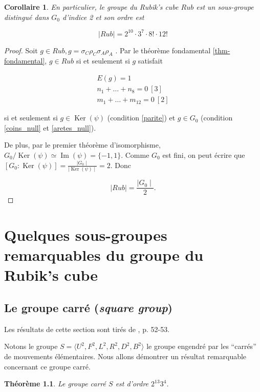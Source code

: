 \documentclass[french]{report}
\newtheorem{theorem}{Théorème}
\newtheorem*{corollary}{Corollaire}
\begin{document}
\begin{corollary}
  En particulier, le groupe du Rubik's cube $Rub$ est un sous-groupe distingué dans $G_0$ d'indice 2 et son ordre est

  $$ \mid Rub \mid = 2 ^{10} \cdot 3 ^{7} \cdot 8! \cdot 12! $$
\end{corollary}

\begin{proof}
  Soit $g \in Rub, g = \sigma_C\rho_C\sigma_A \rho_A$ .
  Par le théorème fondamental \ref{thm-fondamental}, $g \in Rub$ si et seulement si $g$ satisfait

  \begin{gather}
    E(g)=1 \label{parite} \\
    n_1 + \dots + n_8 = 0 \ [  3  ] \label{coins_null} \\
    m_1 + \dots + m _{12} = 0 \ [  2 ]  \label{aretes_null}
  \end{gather}

  si et seulement si $g \in \operatorname{Ker}(\psi)$ (condition \ref{parite}) et $g \in G_0$ (condition \ref{coins_null} et \ref{aretes_null}).

  De plus, par le premier théorème d'isomorphisme, $G_0/ \operatorname{Ker}(\psi) \simeq \operatorname{Im}(\psi) = \{ -1,1 \} $. Comme $G_0$ est fini, on peut écrire que $[G_0 : \operatorname{Ker}(\psi)]  = \frac{\mid G_0 \mid}{\mid \operatorname{Ker}(\psi)\mid}= 2$. Donc

  $$ \mid Rub \mid = \frac{\mid G_0 \mid}{2}.  $$
\end{proof}

\chapter{Quelques sous-groupes remarquables du groupe du Rubik's cube} \label{chap_sous_groupes}

\section{Le groupe carré (\emph{square group})}

Les résultats de cette section sont tirés de \cite{bandelow}, p. 52-53.

Notons le groupe $S = \langle U ^2, F ^2, L ^2, R ^2, D ^2, B ^2 \rangle $ le groupe engendré par les ``carrés'' de mouvements élémentaires. Nous allons démontrer un résultat remarquable concernant ce groupe carré.

\begin{theorem}
  Le groupe carré $S$ est d'ordre $2 ^{13} 3 ^{4}$.
\end{theorem}
\end{document}
